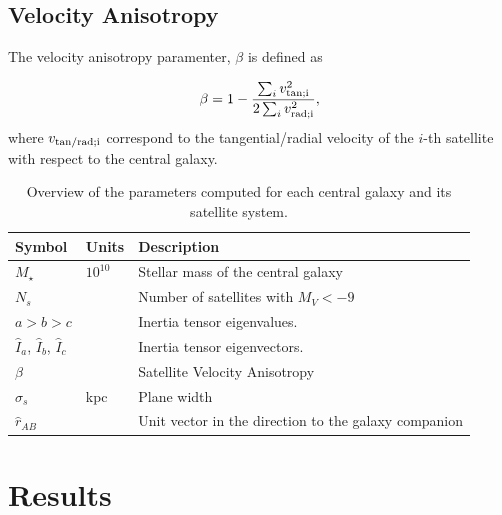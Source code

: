 \documentclass[a4paper,fleqn,usenatbib]{mnras}
\newcommand{\Msun}{{\ifmmode{{\rm{M_{\odot}}}}\else{${\rm{M_{\odot}}}$}\fi}}
\begin{document}
\subsection{Velocity Anisotropy}
\label{sub:beta}

The velocity anisotropy paramenter, $\beta$ is defined as

\begin{equation}
  \beta = 1 - \frac{\sum_i v^2_{\rm{tan}; i}}{2\sum_i v^{2}_{\rm{rad};i}},
\label{eq:beta}
\end{equation}
% 
where $v_{\rm{tan/rad};i}$ correspond to the tangential/radial
velocity of the $i$-th satellite with respect to the central galaxy.



\begin{table}
  \centering
\begin{tabular}{lll}
\hline\hline
Symbol & Units & Description\\\hline
$M_{\star}$ & $10^{10}$\Msun & Stellar mass of the central galaxy\\
$N_s$ & & Number of satellites with $M_V<-9$\\
$a > b> c$ & & Inertia tensor eigenvalues. \\
$\hat{I}_a$, $\hat{I}_b$, $\hat{I}_c$ & & Inertia tensor eigenvectors. \\
$\beta$  &  & Satellite Velocity Anisotropy\\
$\sigma_s$ & kpc & Plane width\\
$\hat{r}_{AB}$& & Unit vector in the direction to the galaxy companion\\
\hline\hline
\end{tabular}
  \caption{Overview of the parameters computed for each central galaxy
    and its satellite system.
  \label{tab:models}}
\end{table}


\section{Results}
\label{sec:results}










\end{document}
